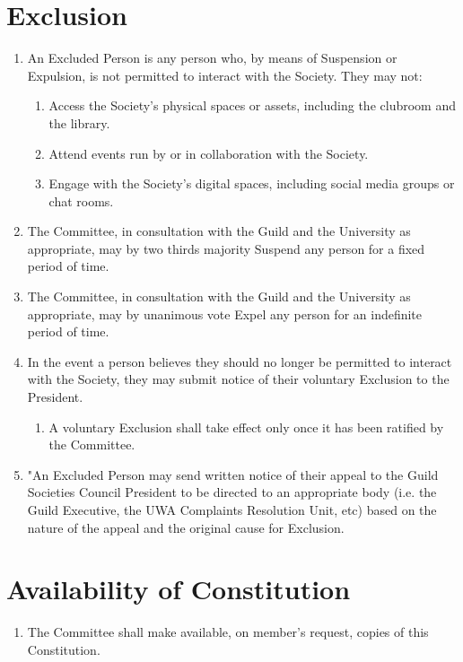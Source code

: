 \documentclass[a4paper]{article}
\begin{document}
\section{Exclusion} \label{sec:exclusion}
\begin{enumerate}
    \item An Excluded Person is any person who, by means of Suspension or Expulsion, is not permitted to interact with the Society. They may not:
          \begin{enumerate}
              \item Access the Society’s physical spaces or assets, including the clubroom and the library.
              \item Attend events run by or in collaboration with the Society.
              \item Engage with the Society’s digital spaces, including social media groups or chat rooms.
          \end{enumerate}
    \item The Committee, in consultation with the Guild and the University as appropriate, may by two thirds majority Suspend any person for a fixed period of time.
    \item The Committee, in consultation with the Guild and the University as appropriate, may by unanimous vote Expel any person for an indefinite period of time.
    \item In the event a person believes they should no longer be permitted to interact with the Society, they may submit notice of their voluntary Exclusion to the President.
          \begin{enumerate}
              \item A voluntary Exclusion shall take effect only once it has been ratified by the Committee.
          \end{enumerate}
    \item "An Excluded Person may send written notice of their appeal to the Guild Societies Council President to be directed to an appropriate body (i.e. the Guild Executive, the UWA Complaints Resolution Unit, etc) based on the nature of the appeal and the original cause for Exclusion.
\end{enumerate}


\section{Availability of Constitution} \label{sec:availability}
\begin{enumerate}
    \item The Committee shall make available, on member's request, copies of this Constitution.
\end{enumerate}
\end{document}

